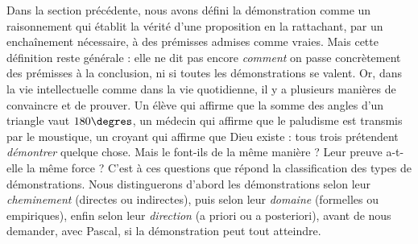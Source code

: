 \documentclass[11pt]{article}
\begin{document}
Dans la section précédente, nous avons défini la démonstration comme un raisonnement qui établit la vérité d'une proposition en la rattachant, par un enchaînement nécessaire, à des prémisses admises comme vraies. Mais cette définition reste générale : elle ne dit pas encore \emph{comment} on passe concrètement des prémisses à la conclusion, ni si toutes les démonstrations se valent. Or, dans la vie intellectuelle comme dans la vie quotidienne, il y a plusieurs manières de convaincre et de prouver. Un élève qui affirme que la somme des angles d'un triangle vaut $180\degres$, un médecin qui affirme que le paludisme est transmis par le moustique, un croyant qui affirme que Dieu existe : tous trois prétendent \emph{démontrer} quelque chose. Mais le font-ils de la même manière ? Leur preuve a-t-elle la même force ? C'est à ces questions que répond la classification des types de démonstrations. Nous distinguerons d'abord les démonstrations selon leur \emph{cheminement} (directes ou indirectes), puis selon leur \emph{domaine} (formelles ou empiriques), enfin selon leur \emph{direction} (a priori ou a posteriori), avant de nous demander, avec Pascal, si la démonstration peut tout atteindre.
\end{document}
